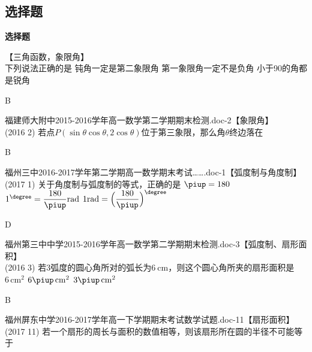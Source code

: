   \subsection{选择题}
  \begin{exercise}{\bf 选择题}
    \item 【三角函数，象限角】\\
      下列说法正确的是\xz
       {钝角一定是第二象限角}
       {第一象限角一定不是负角}
       {小于90\degree 的角都是锐角}
      \begin{answer}B\end{answer}
    \item 福建师大附中2015-2016学年高一数学第二学期期末检测.doc-2【象限角】\\
      (2016  2)
      若点$P(\sin\theta\cos\theta,2\cos\theta)$位于第三象限，那么角$\theta$终边落在\xz
      \begin{answer}
        B
      \end{answer}
    \item 福州三中2016-2017学年第二学期高一数学期末考试…….doc-1【弧度制与角度制】\\
      (2017  1)
      关于角度制与弧度制的等式，正确的是\xz
        {$\piup=180$}
        {$1^{\degree}=\dfrac{180}{\piup}\rm{rad}$}
        {$1\rm{rad}=\Bigl(\dfrac{180}{\piup}\Bigr)^\degree$}
      \begin{answer}
        D
      \end{answer}
    \item 福州第三中中学2015-2016学年高一数学第二学期期末检测.doc-3【弧度制、扇形面积】\\
      (2016  3)
      若3弧度的圆心角所对的弧长为$\SI{6}{\cm}$，则这个圆心角所夹的扇形面积是\xz
       {$6\,\mathrm{cm}^{\mathrm2}$}
       {$6\piup\,\mathrm{cm}^{\mathrm2}$}
       {$3\piup\,\mathrm{cm}^{\mathrm2}$}
      \begin{answer}
        B
      \end{answer}
    \item 福州屏东中学2016-2017学年高一下学期期末考试数学试题.doc-11【扇形面积】\\
      (2017  11)
      若一个扇形的周长与面积的数值相等，则该扇形所在圆的半径不可能等于\xz
      \begin{answer}

\end{answer}
\end{exercise}
